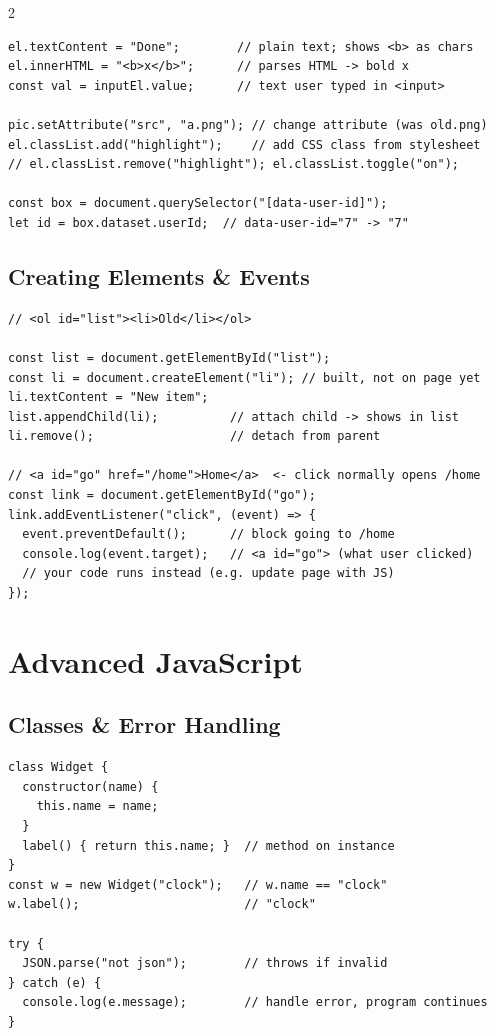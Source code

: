 \documentclass{article}
\begin{document}
\begin{multicols}{2}
\begin{lstlisting}[style=jsexam]
el.textContent = "Done";        // plain text; shows <b> as chars
el.innerHTML = "<b>x</b>";      // parses HTML -> bold x
const val = inputEl.value;      // text user typed in <input>

pic.setAttribute("src", "a.png"); // change attribute (was old.png)
el.classList.add("highlight");    // add CSS class from stylesheet
// el.classList.remove("highlight"); el.classList.toggle("on");

const box = document.querySelector("[data-user-id]");
let id = box.dataset.userId;  // data-user-id="7" -> "7"
\end{lstlisting}

\subsection{Creating Elements \& Events}
\begin{lstlisting}[style=jsexam]
// <ol id="list"><li>Old</li></ol>

const list = document.getElementById("list");
const li = document.createElement("li"); // built, not on page yet
li.textContent = "New item";
list.appendChild(li);          // attach child -> shows in list
li.remove();                   // detach from parent

// <a id="go" href="/home">Home</a>  <- click normally opens /home
const link = document.getElementById("go");
link.addEventListener("click", (event) => {
  event.preventDefault();      // block going to /home
  console.log(event.target);   // <a id="go"> (what user clicked)
  // your code runs instead (e.g. update page with JS)
});
\end{lstlisting}


\columnbreak

\section{Advanced JavaScript}

\subsection{Classes \& Error Handling}
\begin{lstlisting}[style=jsexam]
class Widget {
  constructor(name) { 
    this.name = name; 
  } 
  label() { return this.name; }  // method on instance
}
const w = new Widget("clock");   // w.name == "clock"
w.label();                       // "clock"

try {
  JSON.parse("not json");        // throws if invalid
} catch (e) {
  console.log(e.message);        // handle error, program continues
}
\end{lstlisting}


\end{multicols}
\end{document}
